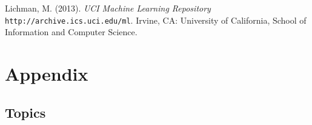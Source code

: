 \documentclass[final]{ieee}
\begin{document}
\begin{thebibliography}{99}





 Lichman, M. (2013). {\it UCI Machine Learning Repository} \texttt{http://archive.ics.uci.edu/ml}. Irvine, CA: University of California, School of Information and Computer Science.



\end{thebibliography}

\newpage

\hbox{}


\newpage

\thispagestyle{empty}

\section*{Appendix}

\subsection*{Topics}

\end{document}
